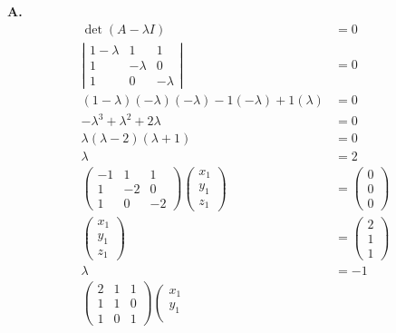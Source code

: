 \documentclass[main.tex]{subfiles}
\begin{document}
\begin{enumerate}
    \textbf{A.} 
    $$
    \begin{aligned}
    \operatorname{det}(A-\lambda I) &= 0\\
    \left|\begin{array}{ccc}
    1-\lambda & 1 & 1 \\
    1 & -\lambda & 0 \\
    1 & 0 & -\lambda
    \end{array}\right| &=0 \\
    (1-\lambda)(-\lambda)(-\lambda)-1(-\lambda)+1(\lambda) &=0 \\
    -\lambda^{3}+\lambda^{2}+2 \lambda &=0 \\
    \lambda(\lambda-2)(\lambda+1) &=0\\
    \lambda & = 2\\
    \left(\begin{array}{ccc}
    -1 & 1 & 1 \\
    1 & -2 & 0 \\
    1 & 0 & -2
    \end{array}\right)\left(\begin{array}{l}
    x_{1} \\
    y_{1} \\
    z_{1}
    \end{array}\right) &=\left(\begin{array}{l}
    0 \\
    0 \\
    0
    \end{array}\right) \\
    \left(\begin{array}{l}
    x_{1} \\
    y_{1} \\
    z_{1}
    \end{array}\right) &=\left(\begin{array}{l}
    2 \\
    1 \\
    1
    \end{array}\right)\\
    \lambda &= -1\\
    \left(\begin{array}{lll}
    2 & 1 & 1 \\
    1 & 1 & 0 \\
    1 & 0 & 1
    \end{array}\right)\left(\begin{array}{l}
    x_{1} \\
    y_{1} \\

\end{array}
\end{aligned}$$
\end{enumerate}
\end{document}
